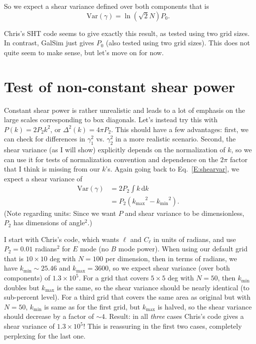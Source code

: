 \documentclass[preprint]{aastex}
\newcommand{\kmax}{\ensuremath{k_\mathrm{max}}}
\newcommand{\kmin}{\ensuremath{k_\mathrm{min}}}
\newcommand{\rmd}{\ensuremath{\mathrm{d}}}
\newcommand{\beq}{\begin{equation}}
\newcommand{\eeq}{\end{equation}}
\begin{document}
So we expect a shear variance defined over both components that is
\beq
\mathrm{Var}(\gamma) = \ln{(\sqrt{2}N)} P_0.
\eeq

Chris's SHT code seems to give exactly this result, as tested using
two grid sizes.  In contrast, GalSim just gives $P_0$ (also tested
using two grid sizes).  This does not quite seem to make sense, but
let's move on for now.

\section{Test of non-constant shear power}

Constant shear power is rather unrealistic and leads to a lot of
emphasis on the large scales corresponding to box diagonals.  Let's
instead try this with $P(k) = 2 P_2 k^2$, or $\Delta^2(k) =
4 \pi P_2$.  This should have a few advantages: first, we can check
for differences in $\gamma_1^2$ vs. $\gamma_2^2$ in a more realistic
scenario.  Second, the shear variance (as I will show) explicitly
depends on the normalization of $k$, so we can use it for tests of
normalization convention and dependence on the $2\pi$ factor that I
think is missing from our $k$'s. Again going back to Eq.~\ref{E:shearvar},
we expect a shear variance of
\begin{align}
\mathrm{Var}(\gamma) &= 2 P_2 \int k\,\rmd k\\
 &= P_2 (\kmax^2-\kmin^2).
\end{align}
(Note regarding units: Since we want $P$ and shear variance to be dimensionless, $P_2$
has dimensions of angle$^2$.)

I start with Chris's code, which wants $\ell$ and $C_\ell$ in units of
radians, and use $P_2=0.01$ radians$^2$ for $E$ mode (no $B$ mode power).  When
using our default grid that is $10\times 10$ deg with $N=100$ per
dimension, then in terms of radians, we have $\kmin\sim 25.46$ and
$\kmax=3600$, so we expect shear variance (over both components) of
$1.3\times 10^5$.  For a grid that covers $5\times 5$ deg with $N=50$,
then $\kmin$ doubles but $\kmax$ is the same, so the shear variance
should be nearly identical (to sub-percent level).  For a third grid
that covers the same area as original but with $N=50$, $\kmin$ is same
as for the first grid, but $\kmax$ is halved, so the shear variance
should decrease by a factor of $\sim 4$.  Result: in all {\em three}
cases Chris's code gives a shear variance of $1.3\times 10^5$!  This
is reassuring in the first two cases, completely perplexing for the
last one.
\end{document}
